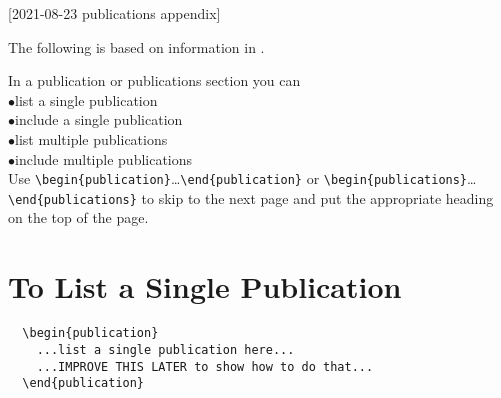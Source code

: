 [2021-08-23 publications appendix]

\index{\verb+\begin{publications}+}
    
The following is based on information in
\cite{template1,template2,template3}.

\renewcommand{\I}{\hspace*{2\ZZparindent}$\bullet$\hspace*{1.5em}}

In a publication or publications section you can\\
  \I list a single publication\\
  \I include a single publication\\
  \I list multiple publications\\
  \I include multiple publications\\
Use\newline
\hspace*{0.5in}\verb+\begin{publication}+\ldots\verb+\end{publication}+\newline
or\newline
\hspace*{0.5in}\verb+\begin{publications}+\ldots\verb+\end{publications}+\newline
to skip to the next page and put the appropriate heading on the
top of the page.

\vspace*{1.5\baselineskip}

\section*{To List a Single Publication}

\begin{verbatim}
  \begin{publication}
    ...list a single publication here...
    ...IMPROVE THIS LATER to show how to do that...
  \end{publication}
\end{verbatim}


